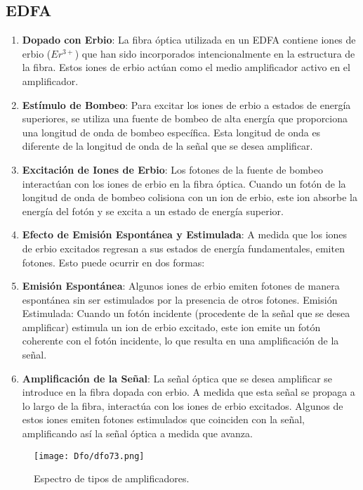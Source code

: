 \documentclass[
	12pt, %
	fleqn, %
	a4paper, %
	oneside, %
]{LegrandOrangeBook}
\begin{document}
\subsection{EDFA}
\begin{enumerate}
\item \textbf{Dopado con Erbio}: La fibra óptica utilizada en un EDFA contiene iones de erbio ($Er^{3+}$) que han sido incorporados intencionalmente en la estructura de la fibra. Estos iones de erbio actúan como el medio amplificador activo en el amplificador.

\item \textbf{Estímulo de Bombeo}: Para excitar los iones de erbio a estados de energía superiores, se utiliza una fuente de bombeo de alta energía que proporciona una longitud de onda de bombeo específica. Esta longitud de onda es diferente de la longitud de onda de la señal que se desea amplificar.

\item \textbf{Excitación de Iones de Erbio}: Los fotones de la fuente de bombeo interactúan con los iones de erbio en la fibra óptica. Cuando un fotón de la longitud de onda de bombeo colisiona con un ion de erbio, este ion absorbe la energía del fotón y se excita a un estado de energía superior.

\item \textbf{Efecto de Emisión Espontánea y Estimulada}: A medida que los iones de erbio excitados regresan a sus estados de energía fundamentales, emiten fotones. Esto puede ocurrir en dos formas:

\item \textbf{Emisión Espontánea}: Algunos iones de erbio emiten fotones de manera espontánea sin ser estimulados por la presencia de otros fotones.
Emisión Estimulada: Cuando un fotón incidente (procedente de la señal que se desea amplificar) estimula un ion de erbio excitado, este ion emite un fotón coherente con el fotón incidente, lo que resulta en una amplificación de la señal.

\item \textbf{Amplificación de la Señal}: La señal óptica que se desea amplificar se introduce en la fibra dopada con erbio. A medida que esta señal se propaga a lo largo de la fibra, interactúa con los iones de erbio excitados. Algunos de estos iones emiten fotones estimulados que coinciden con la señal, amplificando así la señal óptica a medida que avanza.
\end{enumerate}
\begin{figure}[H]
\centering
\texttt{[image: Dfo/dfo73.png]}
\caption{Espectro de tipos de amplificadores.}
\end{figure}
\end{document}
